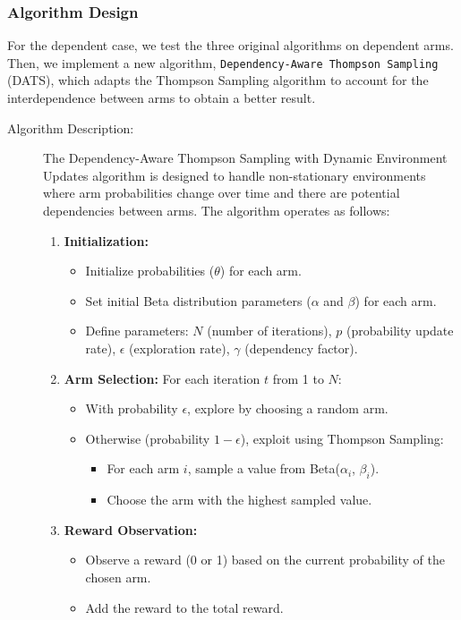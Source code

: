 \documentclass[11pt]{article}
\begin{document}
\subsubsection*{Algorithm Design}
For the dependent case, we test the three original algorithms on dependent arms. Then, we implement a new algorithm, \texttt{Dependency-Aware Thompson Sampling} (DATS), which adapts the Thompson Sampling algorithm to account for the interdependence between arms to obtain a better result.

\begin{description}
\item[Algorithm Description:] The Dependency-Aware Thompson Sampling with Dynamic Environment Updates algorithm is designed to handle non-stationary environments where arm probabilities change over time and there are potential dependencies between arms. The algorithm operates as follows:
\begin{enumerate}
    \item \textbf{Initialization:} 
    \begin{itemize}
        \item Initialize probabilities ($\theta$) for each arm.
        \item Set initial Beta distribution parameters ($\alpha$ and $\beta$) for each arm.
        \item Define parameters: $N$ (number of iterations), $p$ (probability update rate), $\epsilon$ (exploration rate), $\gamma$ (dependency factor).
    \end{itemize}
    
    \item \textbf{Arm Selection:} For each iteration $t$ from 1 to $N$:
    \begin{itemize}
        \item With probability $\epsilon$, explore by choosing a random arm.
        \item Otherwise (probability $1-\epsilon$), exploit using Thompson Sampling:
        \begin{itemize}
            \item For each arm $i$, sample a value from Beta($\alpha_i$, $\beta_i$).
            \item Choose the arm with the highest sampled value.
        \end{itemize}
    \end{itemize}
    
    \item \textbf{Reward Observation:} 
    \begin{itemize}
        \item Observe a reward (0 or 1) based on the current probability of the chosen arm.
        \item Add the reward to the total reward.
    \end{itemize}
    

\end{enumerate}
\end{description}
\end{document}
